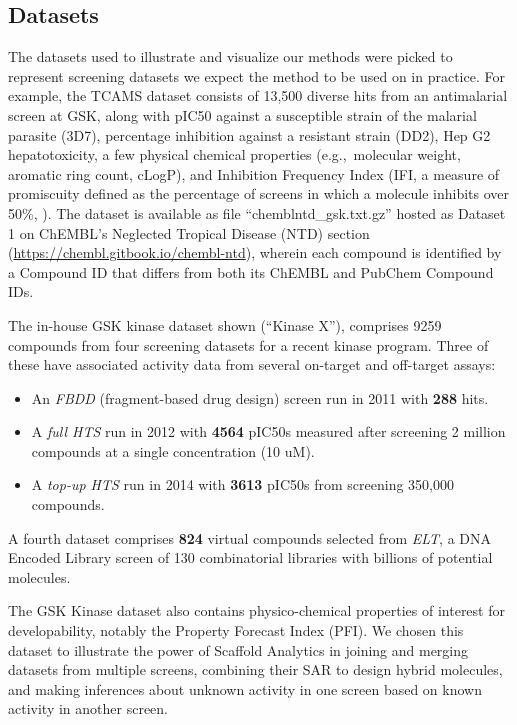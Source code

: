 \documentclass[journal=jacsat,manuscript=article]{achemso}
\newcommand*\eg{e.g.,~}
\begin{document}
\subsection{Datasets}
\label{sec:datasets}
The datasets used to illustrate and visualize our methods were picked
to represent screening datasets we expect the method to
be used on in practice. For example, the TCAMS dataset\cite{Gamo2010}
consists of 13,500 diverse hits from an antimalarial screen at GSK,
along with pIC50 against a susceptible strain of the malarial parasite
(3D7), percentage inhibition against a resistant strain (DD2), Hep G2
hepatotoxicity, a few physical chemical properties (\eg molecular
weight, aromatic ring count, cLogP), and Inhibition Frequency Index
(IFI, a measure of promiscuity defined as the percentage of screens in
which a molecule inhibits over 50\%, \cite{Chakravorty2013IFI}). The dataset is available
as file ``chemblntd\_gsk.txt.gz'' hosted as Dataset 1 on ChEMBL's Neglected Tropical Disease
(NTD) section (\url{https://chembl.gitbook.io/chembl-ntd}), wherein each compound is identified by a Compound ID that differs from both its ChEMBL and PubChem Compound IDs. 

The in-house GSK kinase dataset shown (``Kinase X''), comprises 9259
compounds from four screening datasets for a recent kinase program.
Three of these have associated activity data from several on-target and off-target
assays: 
\begin{itemize}
\item An {\it FBDD}\cite{FBDD} (fragment-based drug design) screen run in 2011 with {\bf 288} hits.
\item A {\it full HTS} run in 2012 with {\bf 4564} {pIC50s} measured after screening 2 million compounds at a single concentration (10 uM).
\item A {\it top-up HTS} run in 2014 with {\bf 3613} {pIC50s} from screening 350,000 compounds.
\end{itemize}
A fourth dataset comprises {\bf 824} virtual compounds selected from
{\it ELT}, a DNA Encoded Library screen\cite{ELT} of 130
combinatorial libraries with billions of potential molecules.

The GSK Kinase dataset also contains physico-chemical properties of interest for
developability, notably the Property Forecast Index (PFI\cite{Young2011}). 
We chosen this dataset to illustrate the power of Scaffold Analytics in joining
and merging datasets from multiple screens, combining their SAR to
design hybrid molecules, and making inferences about unknown activity
in one screen based on known activity in another screen.
\end{document}
